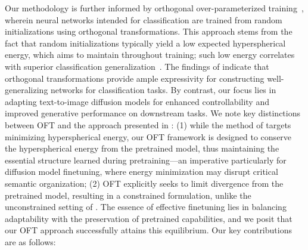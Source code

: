 Our methodology is further informed by orthogonal over-parameterized training~\cite{liu2021orthogonal}, wherein neural networks intended for classification are trained from random initializations using orthogonal transformations. This approach stems from the fact that random initializations typically yield a low expected hyperspherical energy, which \cite{liu2021orthogonal} aims to maintain throughout training; such low energy correlates with superior classification generalization~\cite{liu2018learning,lin2020regularizing}. The findings of \cite{liu2021orthogonal} indicate that orthogonal transformations provide ample expressivity for constructing well-generalizing networks for classification tasks. By contrast, our focus lies in adapting text-to-image diffusion models for enhanced controllability and improved generative performance on downstream tasks. We note key distinctions between OFT and the approach presented in \cite{liu2021orthogonal}: (1) while the method of \cite{liu2021orthogonal} targets minimizing hyperspherical energy, our OFT framework is designed to conserve the hyperspherical energy from the pretrained model, thus maintaining the essential structure learned during pretraining—an imperative particularly for diffusion model finetuning, where energy minimization may disrupt critical semantic organization; (2) OFT explicitly seeks to limit divergence from the pretrained model, resulting in a constrained formulation, unlike the unconstrained setting of \cite{liu2021orthogonal}. The essence of effective finetuning lies in balancing adaptability with the preservation of pretrained capabilities, and we posit that our OFT approach successfully attains this equilibrium. Our key contributions are as follows:

